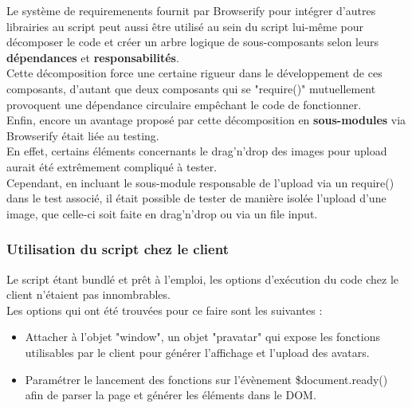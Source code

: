 \documentclass{report}
\begin{document}
          Le système de requiremenents fournit par Browserify pour intégrer d'autres librairies au script peut aussi être utilisé au sein du
          script lui-même pour décomposer le code et créer un arbre logique de sous-composants selon leurs \textbf{dépendances} et \textbf{responsabilités}.\\
          Cette décomposition force une certaine rigueur dans le développement de ces composants, d'autant que deux composants qui se "require()"
          mutuellement provoquent une dépendance circulaire empêchant le code de fonctionner.\\

          Enfin, encore un avantage proposé par cette décomposition en \textbf{sous-modules} via Browserify était liée au testing.\\
          En effet, certains éléments concernants le drag'n'drop des images pour upload aurait été extrêmement compliqué à tester.\\
          Cependant, en incluant le sous-module responsable de l'upload via un require() dans le test associé, il était possible de tester de
          manière isolée l'upload d'une image, que celle-ci soit faite en drag'n'drop ou via un file input.\\

        \subsubsection{Utilisation du script chez le client}
        \label{subs:Utilisation du script chez le client}

          Le script étant bundlé et prêt à l'emploi, les options d'exécution du code chez le client n'étaient pas innombrables.\\

          Les options qui ont été trouvées pour ce faire sont les suivantes :\\

          \begin{itemize}
            \item Attacher à l'objet "window", un objet "pravatar" qui expose les fonctions utilisables par le client pour générer l'affichage et l'upload des avatars.
            \item Paramétrer le lancement des fonctions sur l'évènement \$document.ready() afin de parser la page et générer les éléments dans le DOM.\\
          \end{itemize}
\end{document}
